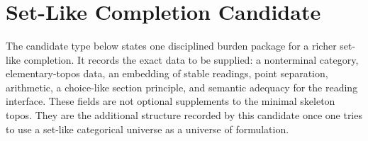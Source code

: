 \documentclass[11pt]{article}
\begin{document}
\begin{code}
\AgdaSymbol{)}\<%
\\
\>[.][@{}l@{}]\<[4909I]%
\>[8]\AgdaSpace{}%
\AgdaSpace{}%
\<%
\\
\>[8][@{}l@{\AgdaIndent{0}}]%
\>[10]\AgdaSpace{}%
\AgdaSpace{}%
\AgdaSpace{}%
\AgdaSpace{}%
\<%
\\
%
\>[10]\AgdaSpace{}%
\AgdaSymbol{)}\<%
\\
%
\\[\AgdaEmptyExtraSkip]%
\>[0]\AgdaSpace{}%
\AgdaSpace{}%
\<%
\end{code}

\section{Set-Like Completion Candidate}

The candidate type below states one disciplined burden package for a
richer set-like completion.  It records the exact data to be supplied: a
nonterminal category, elementary-topos data, an embedding of stable
readings, point separation, arithmetic, a choice-like section principle,
and semantic adequacy for the reading interface.  These fields are not
optional supplements to the minimal skeleton topos.  They are the
additional structure recorded by this candidate once one tries to use a
set-like categorical universe as a universe of formulation.
\end{document}
